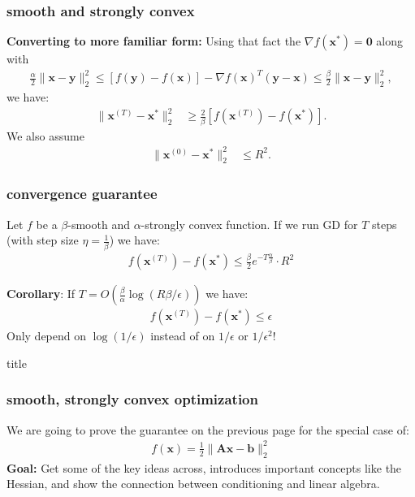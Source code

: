 \documentclass[compress]{beamer}
\newcommand{\bv}[1]{\mathbf{#1}}
\begin{document}
\begin{frame}[t]
	\frametitle{smooth and strongly convex}
	\textbf{Converting to more familiar form:}
	Using that fact the $\nabla f(\bv{x}^*) = \bv{0}$ along with
	\begin{align*}
		{\frac{\alpha}{2}}\|\bv{x} - \bv{y}\|_2^2 \leq  \left[f(\bv{y}) - f(\bv{x})\right] - \nabla f(\bv{x})^T(\bv{y} - \bv{x}) \leq {\frac{\beta}{2}}\|\bv{x} - \bv{y}\|_2^2, 
	\end{align*}
	we have:
	\begin{align*}
		\|\bv{x}^{(T)} - \bv{x}^*\|_2^2 &\geq \frac{2}{\beta} \left[f(\bv{x}^{(T)}) - f(\bv{x}^*)\right].
	\end{align*}	
We also assume
\begin{align*}
			\|\bv{x}^{(0)} - \bv{x}^*\|_2^2 &\leq R^2.
\end{align*}
\end{frame}

\begin{frame}[t]
	\frametitle{convergence guarantee}
	\begin{corollary}
		Let $f$ be a $\beta$-smooth and $\alpha$-strongly convex function. If we run GD for $T$ steps (with step size $\eta = \frac{1}{\beta}$) we have:
		\begin{align*}
			f(\bv{x}^{(T)}) - f(\bv{x}^*)  \leq \frac{\beta}{2} e^{-T\frac{\alpha}{\beta}} \cdot  R^2
		\end{align*} 
	\end{corollary}	
	\textbf{Corollary}: 
	If \alert{$T = O\left(\frac{\beta}{\alpha}\log(R\beta/\epsilon)\right)$} we have:
	\begin{align*}
		f({\bv{x}}^{(T)}) - f(\bv{x}^*) \leq \epsilon
	\end{align*}
	Only depend on $\log(1/\epsilon)$ instead of on $1/\epsilon$ or $1/\epsilon^2$!
\end{frame}

\begin{frame}{title}
	\frametitle{smooth, strongly convex optimization}
	We are going to prove the guarantee on the previous page for the special case of:
	\begin{align*}
		f(\bv{x}) = \frac{1}{2}\|\bv{A}\bv{x} - \bv{b}\|_2^2
	\end{align*}
	\textbf{Goal:} Get some of the key ideas across, introduces important concepts like the Hessian, and show the connection between conditioning and linear algebra.
	
\end{frame}
\end{document}
